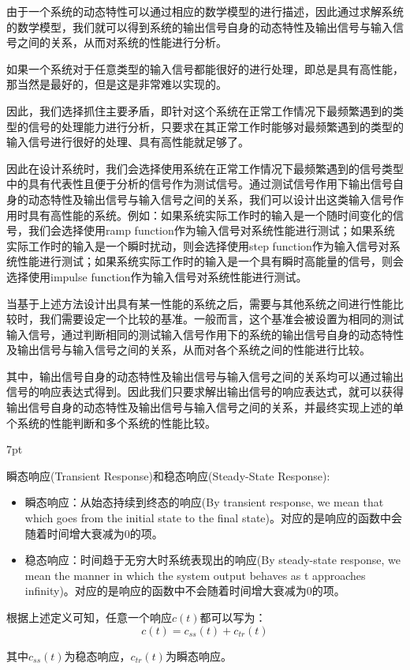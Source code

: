 \documentclass{article}
\numberwithin{equation}{section}
\numberwithin{figure}{section}
\newenvironment{formal}{%
\def\FrameCommand{%
\hspace{1pt}%
{\color{DarkBlue}\vrule width 2pt}%
{\color{formalshade}\vrule width 4pt}%
\colorbox{formalshade}%
}%
\MakeFramed{\advance\hsize-\width\FrameRestore}%
\noindent\hspace{-4.55pt}%
\begin{adjustwidth}{}{7pt}%
\vspace{2pt}\vspace{2pt}%
}
{%
\vspace{2pt}\end{adjustwidth}\endMakeFramed%
}
\begin{document}
由于一个系统的动态特性可以通过相应的数学模型的进行描述，因此通过求解系统的数学模型，我们就可以得到系统的输出信号自身的动态特性及输出信号与输入信号之间的关系，从而对系统的性能进行分析。

如果一个系统对于任意类型的输入信号都能很好的进行处理，即总是具有高性能，那当然是最好的，但是这是非常难以实现的。

因此，我们选择抓住主要矛盾，即针对这个系统在正常工作情况下最频繁遇到的类型的信号的处理能力进行分析，只要求在其正常工作时能够对最频繁遇到的类型的输入信号进行很好的处理、具有高性能就足够了。

因此在设计系统时，我们会选择使用系统在正常工作情况下最频繁遇到的信号类型中的具有代表性且便于分析的信号作为测试信号。通过测试信号作用下输出信号自身的动态特性及输出信号与输入信号之间的关系，我们可以设计出这类输入信号作用时具有高性能的系统。例如：如果系统实际工作时的输入是一个随时间变化的信号，我们会选择使用ramp function作为输入信号对系统性能进行测试；如果系统实际工作时的输入是一个瞬时扰动，则会选择使用step function作为输入信号对系统性能进行测试；如果系统实际工作时的输入是一个具有瞬时高能量的信号，则会选择使用impulse function作为输入信号对系统性能进行测试。

当基于上述方法设计出具有某一性能的系统之后，需要与其他系统之间进行性能比较时，我们需要设定一个比较的基准。一般而言，这个基准会被设置为相同的测试输入信号，通过判断相同的测试输入信号作用下的系统的输出信号自身的动态特性及输出信号与输入信号之间的关系，从而对各个系统之间的性能进行比较。

其中，输出信号自身的动态特性及输出信号与输入信号之间的关系均可以通过输出信号的响应表达式得到。因此我们只要求解出输出信号的响应表达式，就可以获得输出信号自身的动态特性及输出信号与输入信号之间的关系，并最终实现上述的单个系统的性能判断和多个系统的性能比较。

\begin{formal}
    瞬态响应(Transient Response)和稳态响应(Steady-State Response):
    \begin{itemize}
        \item 瞬态响应：从始态持续到终态的响应(By transient response, we mean that which goes from the initial state to the final state)。对应的是响应的函数中会随着时间增大衰减为0的项。
        \item 稳态响应：时间趋于无穷大时系统表现出的响应(By steady-state response, we mean the manner in which the system output behaves as
        t approaches infinity)。对应的是响应的函数中不会随着时间增大衰减为0的项。
    \end{itemize}

    根据上述定义可知，任意一个响应$c(t)$都可以写为：
    \begin{equation}
        c(t)=c_{ss}(t)+c_{tr}(t)
    \end{equation}

    其中$c_{ss}(t)$为稳态响应，$c_{tr}(t)$为瞬态响应。
\end{formal}
\end{document}

